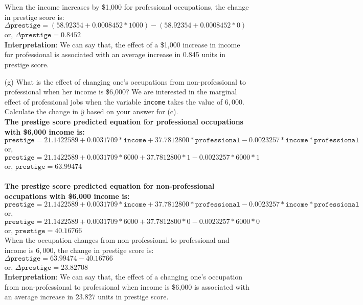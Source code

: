 \documentclass[12pt,letterpaper]{article}
\begin{document}
\begin{enumerate}
	When the income increases by \$1,000 for professional occupations, the change in prestige score is: \\
	\textit{$\Delta \texttt{prestige} = (58.92354 + 0.0008452 * 1000) - (58.92354 + 0.0008452 * 0)$}\\
	or, \textit{$\Delta \texttt{prestige} = 0.8452$}\\
	
	\textbf{Interpretation}: We can say that, the effect of a \$1,000 increase in income for professional is associated with an average increase in 0.845 units in prestige score.
	
	\newpage
	
	\item [(g)]
	What is the effect of changing one's occupations from non-professional to professional when her income is \$6,000? We are interested in the marginal effect of professional jobs when the variable \texttt{income} takes the value of $6,000$. Calculate the change in $\hat{y}$ based on your answer for (c).
	\\
	
	\textbf{The prestige score predicted equation for professional occupations with \$6,000 income is:}\\
	\textit{$\texttt{prestige} = 21.1422589 + 0.0031709*\texttt{income} + 37.7812800*\texttt{professional} - 0.0023257*\texttt{income}*\texttt{professional}$}\\
	or, \textit{$\texttt{prestige} = 21.1422589 + 0.0031709 * 6000 + 37.7812800 * 1 - 0.0023257 * 6000 * 1$}\\
	or, \textit{$\texttt{prestige} = 63.99474$}\\
	\\
	\textbf{The prestige score predicted equation for non-professional occupations with \$6,000 income is:}\\
	\textit{$\texttt{prestige} = 21.1422589 + 0.0031709*\texttt{income} + 37.7812800*\texttt{professional} - 0.0023257*\texttt{income}*\texttt{professional}$}\\
	or, \textit{$\texttt{prestige} = 21.1422589 + 0.0031709 * 6000 + 37.7812800 * 0 - 0.0023257 * 6000 * 0$}\\
	or, \textit{$\texttt{prestige} = 40.16766$}\\
	
	When the occupation changes from non-professional to professional and income is $6,000$, the change in prestige score is: \\
	\textit{$\Delta \texttt{prestige} =  63.99474 - 40.16766$}\\
	or, \textit{$\Delta \texttt{prestige} = 23.82708$}\\
	
	\textbf{Interpretation}: We can say that, the effect of a changing one's occupation from non-professional to professional when income is \$6,000 is associated with an average increase in 23.827 units in prestige score.
	
\end{enumerate}
\end{document}
